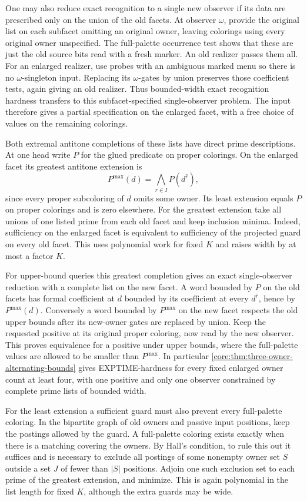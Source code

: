 One may also reduce exact recognition to a single
new observer if its data are prescribed only on
the union of the old facets. At observer $\omega$,
provide the original list on each subfacet
omitting an original owner, leaving colorings
using every original owner unspecified. The
full-palette occurrence test shows that these
are just the old source bits read with a fresh
marker. An old realizer passes them all. For an
enlarged realizer, use probes with an ambiguous
marked menu so there is no $\omega$-singleton
input. Replacing its $\omega$-gates by union
preserves those coefficient tests, again giving
an old realizer. Thus bounded-width exact
recognition hardness transfers to this
subfacet-specified single-observer problem.
The input therefore gives a partial specification
on the enlarged facet, with a free choice of
values on the remaining colorings.

Both extremal antitone completions of these lists
have direct prime descriptions. At one head write
$P$ for the glued predicate on proper colorings.
On the enlarged facet its greatest antitone
extension is
\[
 P^{\max}(d)=\bigwedge_{r\in I}P(d^{\widehat r}),
\]
since every proper subcoloring of $d$ omits some
owner. Its least extension equals $P$ on proper
colorings and is zero elsewhere. For the greatest
extension take all unions of one listed prime
from each old facet and keep inclusion minima.
Indeed, sufficiency on the enlarged facet is
equivalent to sufficiency of the projected guard
on every old facet. This uses polynomial work for
fixed $K$ and raises width by at most a factor $K$.

For upper-bound queries this greatest completion
gives an exact single-observer reduction with a
complete list on the new facet. A word bounded
by $P$ on the old facets has formal coefficient
at $d$ bounded by its coefficient at every
$d^{\widehat r}$, hence by $P^{\max}(d)$. Conversely
a word bounded by $P^{\max}$ on the new facet
respects the old upper bounds after its new-owner
gates are replaced by union. Keep the requested
positive at its original proper coloring, now
read by the new observer. This proves equivalence
for a positive under upper bounds, where the
full-palette values are allowed to be smaller
than $P^{\max}$. In particular
\cref{core:thm:three-owner-alternating-bounds}
gives EXPTIME-hardness for every fixed enlarged
owner count at least four, with one positive and
only one observer constrained by complete prime
lists of bounded width.

For the least extension a sufficient guard must
also prevent every full-palette coloring. In the
bipartite graph of old owners and passive input
positions, keep the postings allowed by the guard.
A full-palette coloring exists exactly when there
is a matching covering the owners. By Hall's
condition, to rule this out it suffices and is
necessary to exclude all postings of some nonempty
owner set $S$ outside a set $J$ of fewer than $|S|$
positions. Adjoin one such exclusion set to each
prime of the greatest extension, and minimize.
This is again polynomial in the list length for
fixed $K$, although the extra guards may be wide.

